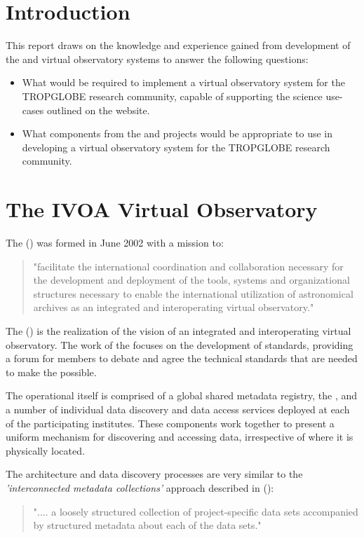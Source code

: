 \documentclass{article}
\begin{document}
\section{Introduction}

This report draws on the knowledge and experience gained from development
of the \cite{astro} and \cite{ivoa} virtual observatory systems to answer
the following questions:

\begin{itemize}
    \item What would be required to implement a virtual observatory system
    for the TROPGLOBE research community, capable of supporting the science
    use-cases outlined on the \cite{trop} website.
    \item What components from the \cite{astro} and \cite{ivoa} projects
    would be appropriate to use in developing a virtual observatory system
    for the TROPGLOBE research community.
\end{itemize}

\section{The IVOA Virtual Observatory}

The  (\cite{ivoa}) was formed in June 2002 with a mission to:
\begin{quote}
"facilitate the international coordination and collaboration necessary for
the development and deployment of the tools, systems and organizational
structures necessary to enable the international utilization of astronomical
archives as an integrated and interoperating virtual observatory."
\end{quote}

The  (\cite{vo}) is the realization of the \cite{ivoa} vision
of an integrated and interoperating virtual observatory.
The work of the \cite{ivoa} focuses on the development of standards,
providing a forum for members to debate and agree the technical standards
that are needed to make the \cite{vo} possible.

The operational \cite{vo} itself is comprised of a global shared metadata
registry, the \cite{ivoa-reg}, and a number of individual data discovery
and data access services deployed at each of the participating institutes.
These components work together to present a uniform mechanism for discovering
and accessing data, irrespective of where it is physically located.

The \cite{vo} architecture and data discovery processes are very similar
to the \textit{'interconnected metadata collections'} approach described
in  (\cite{jones-2006}):
\begin{quote}
".... a loosely structured collection of project-specific data sets
accompanied by structured metadata about each of the data sets."
\end{quote}
\end{document}

